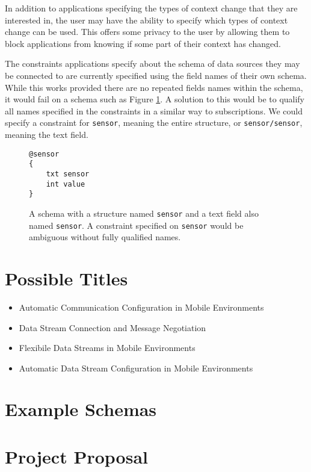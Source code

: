 \documentclass[12pt,twoside,notitlepage]{report}
\begin{document}
In addition to applications specifying the types of context change that they are interested in, the user may have the ability to specify which types of context change can be used. 
This offers some privacy to the user by allowing them to block applications from knowing if some part of their context has changed.

The constraints applications specify about the schema of data sources they may be connected to are currently specified using the field names of their own schema.
While this works provided there are no repeated fields names within the schema, it would fail on a schema such as Figure \ref{fig:repeatednameschema}. 
A solution to this would be to qualify all names specified in the constraints in a similar way to subscriptions. 
We could specify a constraint for {\tt sensor}, meaning the entire structure, or {\tt sensor/sensor}, meaning the text field.

\begin{figure}[tbh]
\begin{lstlisting}
@sensor
{
	txt sensor
	int value
}
\end{lstlisting}
\caption[Schema with repeated name]{A schema with a structure named {\tt sensor} and a text field also named {\tt sensor}. A constraint specified on {\tt sensor} would be ambiguous without fully qualified names.}
\label{fig:repeatednameschema}
\end{figure}

\cleardoublepage


\nocite{*}

\cleardoublepage

\appendix

\chapter{Possible Titles}

\begin{itemize}
\item Automatic Communication Configuration in Mobile Environments
\item Data Stream Connection and Message Negotiation
\item Flexibile Data Streams in Mobile Environments
\item Automatic Data Stream Configuration in Mobile Environments
\end{itemize}

\cleardoublepage

\chapter{Example Schemas}



\cleardoublepage

\chapter{Project Proposal}


\end{document}
